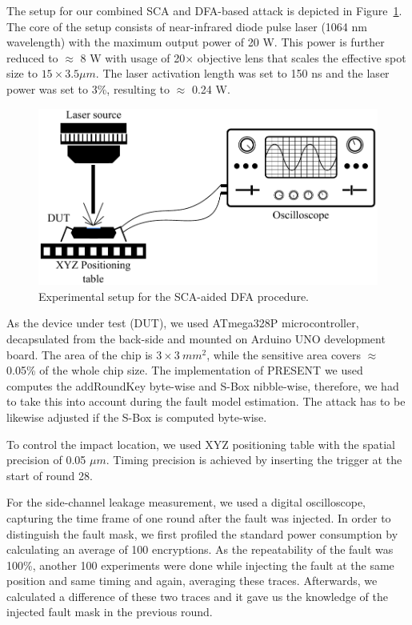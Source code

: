 \documentclass[10pt, conference, compsocconf]{IEEEtran}  %
\numberwithin{Definition}{section}
\numberwithin{Claim}{section}
\begin{document}
The setup for our combined SCA and DFA-based attack is depicted in Figure~\ref{setup}. The core of the setup consists of near-infrared diode pulse laser (1064 nm wavelength) with the maximum output power of 20 W. 
This power is further reduced to $\approx$ 8 W with usage of 20$\times$ objective lens that scales the effective spot size to $15\times3.5 \mu m$. 
The laser activation length was set to 150 ns and the laser power was set to 3\%, resulting to $\approx$ 0.24 W.
\begin{figure}
	\centering
	\includegraphics[width=0.8\linewidth]{combined_setup}
    \caption{Experimental setup for the SCA-aided DFA procedure.}
    \label{setup}
\end{figure}

As the device under test (DUT), we used ATmega328P microcontroller, decapsulated from the back-side and mounted on Arduino UNO development board. The area of the chip is $3\times 3~mm^2$, while the sensitive area covers $\approx$ 0.05\% of the whole chip size. The implementation of PRESENT we used computes the addRoundKey byte-wise and S-Box nibble-wise, therefore, we had to take this into account during the fault model estimation.
The attack has to be likewise adjusted if the S-Box is computed byte-wise.

To control the impact location, we used XYZ positioning table with the spatial precision of 0.05 $\mu m$.
Timing precision is achieved by inserting the trigger at the start of round 28.

For the side-channel leakage measurement, we used a digital oscilloscope, capturing the time frame of one round after the fault was injected. In order to distinguish the fault mask, we first profiled the standard power consumption by calculating an average of 100 encryptions. As the repeatability of the fault was 100\%, another 100 experiments were done while injecting the fault at the same position and same timing and again, averaging these traces. Afterwards, we calculated a difference of these two traces and it gave us the knowledge of the injected fault mask in the previous round. 
\end{document}
